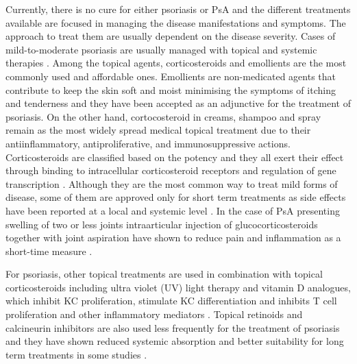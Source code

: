 {Currently, there is no cure for either psoriasis or PsA and the different treatments available are focused in managing the disease manifestations and symptoms. The approach to treat them are usually dependent on the disease severity. Cases of mild-to-moderate psoriasis are usually managed with topical and systemic therapies \parencite{Menter2009}. Among the topical agents, corticosteroids and emollients are the most commonly used and affordable ones. Emollients are non-medicated agents that contribute to keep the skin soft and moist minimising the symptoms of itching and tenderness and they have been accepted as an adjunctive for the treatment of psoriasis. On the other hand, cortocosteroid in creams, shampoo and spray remain as the most widely spread medical topical treatment due to their antiinflammatory, antiproliferative, and immunosuppressive actions. Corticosteroids are classified based on the potency and they all exert their effect through binding to intracellular corticosteroid receptors and regulation of gene transcription \parencite{Tadicherla2009}. Although they are the most common way to treat mild forms of disease, some of them are approved only for short term treatments as side effects have been reported at a local and systemic level \parencite {Menter2009}. In the case of PsA presenting swelling of two or less joints intraarticular injection of glucocorticosteroids together with joint aspiration have shown to reduce pain and inflammation as a short-time measure \parencite{Coates2016}.    

For psoriasis, other topical treatments are used in combination with topical corticosteroids including ultra violet (UV) light therapy and vitamin D analogues, which inhibit KC proliferation, stimulate KC differentiation and inhibits T cell proliferation and other inflammatory mediators \parencite{Rizova2001}. Topical retinoids and calcineurin inhibitors are also used less frequently for the treatment of psoriasis and they have shown reduced systemic absorption and better suitability for long term treatments in some studies \parencite{Weinstein2003, Menter2009}.

}
